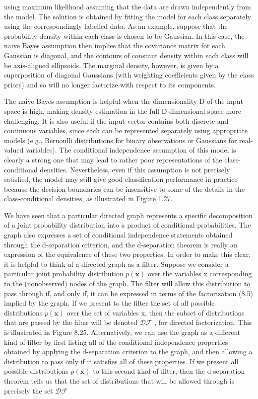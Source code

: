 \documentclass[
  10
]{article}
\author{}
\date{}
\begin{document}
using maximum likelihood assuming that the data are drawn independently
from the model. The solution is obtained by fitting the model for each
class separately using the correspondingly labelled data. As an example,
suppose that the probability density within each class is chosen to be
Gaussian. In this case, the naive Bayes assumption then implies that the
covariance matrix for each Gaussian is diagonal, and the contours of
constant density within each class will be axis-aligned ellipsoids. The
marginal density, however, is given by a superposition of diagonal
Gaussians (with weighting coefficients given by the class priors) and so
will no longer factorize with respect to its components.

The naive Bayes assumption is helpful when the dimensionality D of the
input space is high, making density estimation in the full D-dimensional
space more challenging. It is also useful if the input vector contains
both discrete and continuous variables, since each can be represented
separately using appropriate models (e.g., Bernoulli distributions for
binary observations or Gaussians for real-valued variables). The
conditional independence assumption of this model is clearly a strong
one that may lead to rather poor representations of the
class-conditional densities. Nevertheless, even if this assumption is
not precisely satisfied, the model may still give good classification
performance in practice because the decision boundaries can be
insensitive to some of the details in the class-conditional densities,
as illustrated in Figure 1.27.

We have seen that a particular directed graph represents a specific
decomposition of a joint probability distribution into a product of
conditional probabilities. The graph also expresses a set of conditional
independence statements obtained through the d-separation criterion, and
the d-separation theorem is really an expression of the equivalence of
these two properties. In order to make this clear, it is helpful to
think of a directed graph as a filter. Suppose we consider a particular
joint probability distribution \(p ( \mathbf { x } )\) over the
variables x corresponding to the (nonobserved) nodes of the graph. The
filter will allow this distribution to pass through if, and only if, it
can be expressed in terms of the factorization (8.5) implied by the
graph. If we present to the filter the set of all possible distributions
\(p ( \mathbf { x } )\) over the set of variables x, then the subset of
distributions that are passed by the filter will be denoted
\(\mathcal { D F }\) , for directed factorization. This is illustrated
in Figure 8.25. Alternatively, we can use the graph as a different kind
of filter by first listing all of the conditional independence
properties obtained by applying the d-separation criterion to the graph,
and then allowing a distribution to pass only if it satisfies all of
these properties. If we present all possible distributions
\(p ( \mathbf { x } )\) to this second kind of filter, then the
d-separation theorem tells us that the set of distributions that will be
allowed through is precisely the set \(\mathcal { D F }\)
\end{document}
